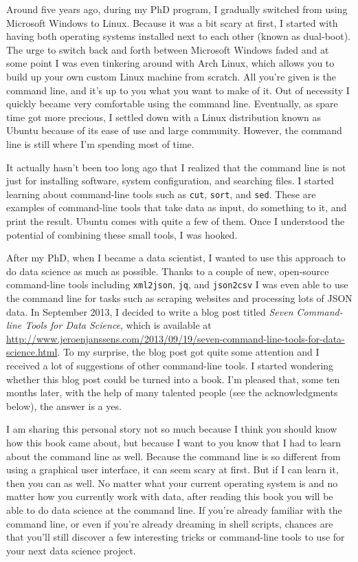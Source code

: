 \documentclass[
]{book}
\theoremstyle{definition}
\theoremstyle{definition}
\theoremstyle{definition}
\theoremstyle{remark}
\begin{document}
Around five years ago, during my PhD program, I gradually switched from using Microsoft Windows to Linux. Because it was a bit scary at first, I started with having both operating systems installed next to each other (known as dual-boot). The urge to switch back and forth between Microsoft Windows faded and at some point I was even tinkering around with Arch Linux, which allows you to build up your own custom Linux machine from scratch. All you're given is the command line, and it's up to you what you want to make of it. Out of necessity I quickly became very comfortable using the command line. Eventually, as spare time got more precious, I settled down with a Linux distribution known as Ubuntu because of its ease of use and large community. However, the command line is still where I'm spending most of time.

It actually hasn't been too long ago that I realized that the command line is not just for installing software, system configuration, and searching files. I started learning about command-line tools such as \texttt{cut}, \texttt{sort}, and \texttt{sed}. These are examples of command-line tools that take data as input, do something to it, and print the result. Ubuntu comes with quite a few of them. Once I understood the potential of combining these small tools, I was hooked.

After my PhD, when I became a data scientist, I wanted to use this approach to do data science as much as possible. Thanks to a couple of new, open-source command-line tools including \texttt{xml2json}, \texttt{jq}, and \texttt{json2csv} I was even able to use the command line for tasks such as scraping websites and processing lots of JSON data. In September 2013, I decided to write a blog post titled \emph{Seven Command-line Tools for Data Science}, which is available at \url{http://www.jeroenjanssens.com/2013/09/19/seven-command-line-tools-for-data-science.html}. To my surprise, the blog post got quite some attention and I received a lot of suggestions of other command-line tools. I started wondering whether this blog post could be turned into a book. I'm pleased that, some ten months later, with the help of many talented people (see the acknowledgments below), the answer is a yes.

I am sharing this personal story not so much because I think you should know how this book came about, but because I want to you know that I had to learn about the command line as well. Because the command line is so different from using a graphical user interface, it can seem scary at first. But if I can learn it, then you can as well. No matter what your current operating system is and no matter how you currently work with data, after reading this book you will be able to do data science at the command line. If you're already familiar with the command line, or even if you're already dreaming in shell scripts, chances are that you'll still discover a few interesting tricks or command-line tools to use for your next data science project.
\end{document}
